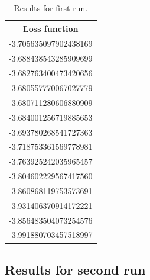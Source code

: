 \documentclass[a4paper]{article}
\begin{document}
\begin{table}[H]
\centering
\label{firstrun}
\caption{Results for first run.}
\begin{tabular}{|c|}%
\hline
\bfseries Loss function \\%
\hline
-3.705635097902438169 \\ \hline
-3.688438543285909699 \\ \hline
-3.682763400473420656 \\ \hline
-3.680557770067027779 \\ \hline
-3.680711280606880909 \\ \hline
-3.684001256719885653 \\ \hline
-3.693780268541727363 \\ \hline
-3.718753361569778981 \\ \hline
-3.763925242035965457 \\ \hline
-3.804602229567417560 \\ \hline
-3.860868119753573691 \\ \hline
-3.931406370914172221 \\ \hline
-3.856483504073254576 \\ \hline
-3.991880703457518997 \\
\hline
\end{tabular}
\end{table}

\subsection{Results for second run}
\end{document}
